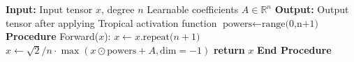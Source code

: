 \documentclass{article} %
\theoremstyle{plain}
\theoremstyle{definition}
\theoremstyle{remark}
\begin{document}
\begin{algorithm}[!htbp]
   \caption{Tropical Activation Function Forward Pass}
   \label{alg:tropical_forward}
   \begin{algorithmic}
      \STATE \textbf{Input:} Input tensor $x$, degree $n$
       Learnable coefficients $A \in \mathbb{R}^n$       
      \STATE \textbf{Output:} Output tensor after applying Tropical activation function
      \STATE
\STATE $\text{powers} \leftarrow  \text{range(0,n+1)}$      
      \STATE \textbf{Procedure} Forward($x$):
      \STATE \quad $x \leftarrow x.\text{repeat($n+1$)}$
      \STATE \quad $x \leftarrow \sqrt{2}/n \cdot \max(x\odot \text{powers} + A, \text{dim}=-1)$
      \STATE \quad \textbf{return} $x$
      \STATE \textbf{End Procedure}
   \end{algorithmic}
\end{algorithm}
\end{document}
